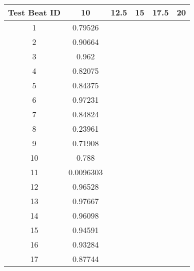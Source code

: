 \begin{tabular}{|c|c|c|c|c|c|}
\hline 
Test Beat ID & 10 & 12.5 & 15 & 17.5 & 20 \\ 
\hline 
1 & 0.79526 &  &  &  &  \\ 
2 & 0.90664 &  &  &  &  \\ 
3 & 0.962 &  &  &  &  \\ 
4 & 0.82075 &  &  &  &  \\ 
5 & 0.84375 &  &  &  &  \\ 
6 & 0.97231 &  &  &  &  \\ 
7 & 0.84824 &  &  &  &  \\ 
8 & 0.23961 &  &  &  &  \\ 
9 & 0.71908 &  &  &  &  \\ 
10 & 0.788 &  &  &  &  \\ 
11 & 0.0096303 &  &  &  &  \\ 
12 & 0.96528 &  &  &  &  \\ 
13 & 0.97667 &  &  &  &  \\ 
14 & 0.96098 &  &  &  &  \\ 
15 & 0.94591 &  &  &  &  \\ 
16 & 0.93284 &  &  &  &  \\ 
17 & 0.87744 &  &  &  &  \\ 
\hline 
\end{tabular}